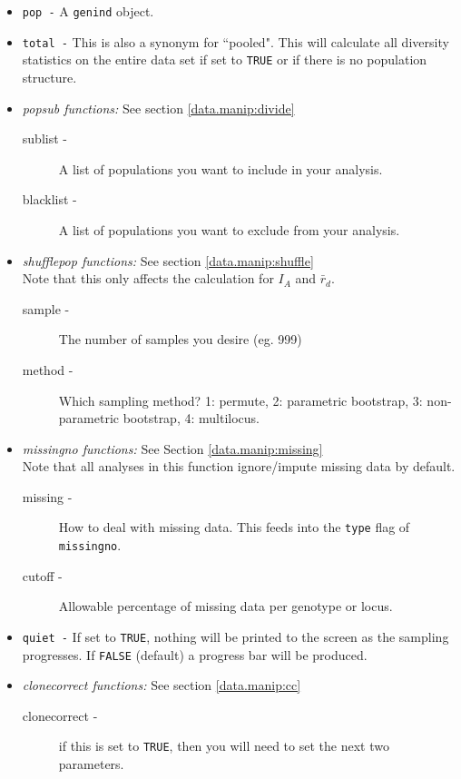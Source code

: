 \documentclass[letterpaper]{article}\usepackage[]{graphicx}\usepackage[]{color}
\begin{document}
\begin{itemize}
  \item \texttt{pop -} A \texttt{genind} object.
  \item \texttt{total -} This is also a synonym for ``pooled". This will calculate all diversity statistics on the entire data set if set to \texttt{TRUE} or if there is no population structure.
  \item \emph{popsub functions:} See section \ref{data.manip:divide}
  \begin{description}
    \item[sublist -] A list of populations you want to include in your analysis.
    \item[blacklist -] A list of populations you want to exclude from your analysis.
  \end{description}
  \item \emph{shufflepop functions:} See section \ref{data.manip:shuffle} \\ Note that this only affects the calculation for $I_A$ and $\bar r_d$.
  \begin{description}
    \item[sample -] The number of samples you desire (eg. 999)
    \item[method -] Which sampling method? 1: permute, 2: parametric bootstrap, 3: non-parametric bootstrap, 4: multilocus.
  \end{description}
  \item \emph{missingno functions:} See Section \ref{data.manip:missing} \\ Note that all analyses in this function ignore/impute missing data by default.
    \begin{description}
      \item[missing -] How to deal with missing data. This feeds into the \texttt{type} flag of \texttt{missingno}.
      \item[cutoff -] Allowable percentage of missing data per genotype or locus.
    \end{description}
  \item \texttt{quiet -} If set to \texttt{TRUE}, nothing will be printed to the screen as the sampling progresses. If \texttt{FALSE} (default) a progress bar will be produced.
  \item \emph{clonecorrect functions:} See section \ref{data.manip:cc}
  \begin{description}
    \item[clonecorrect -] if this is set to \texttt{TRUE}, then you will need to set the next two parameters.

\end{description}
\end{itemize}
\end{document}
